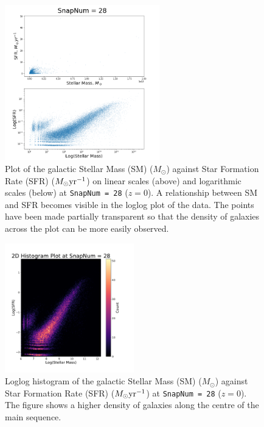 \documentclass[12pt]{article}
\begin{document}
\begin{figure}[htbp]
  \centerline{\includegraphics[width=0.6\textwidth]{SMvSFR.png}}
  \caption{Plot of the galactic Stellar Mass (SM) ($M_\odot$) against Star Formation Rate (SFR) ($M_\odot\rm{yr}^{-1}$) on linear scales (above) and logarithmic scales (below) at {\tt SnapNum = 28} ($z=0$).  A relationship between SM and SFR becomes visible in the loglog plot of the data.  The points have been made partially transparent so that the density of galaxies across the plot can be more easily observed.}
  \label{fig:SMvSFR}
\end{figure}

\begin{figure}[htbp]
  \centerline{\includegraphics[width=0.5\textwidth]{hist.pdf}}
    \caption{Loglog histogram of the galactic Stellar Mass (SM) ($M_\odot$) against Star Formation Rate (SFR) ($M_\odot\rm{yr}^{-1}$) at {\tt SnapNum = 28} ($z=0$).  The figure shows a higher density of galaxies along the centre of the main sequence.}
    \label{fig:hist}
\end{figure}
\end{document}
